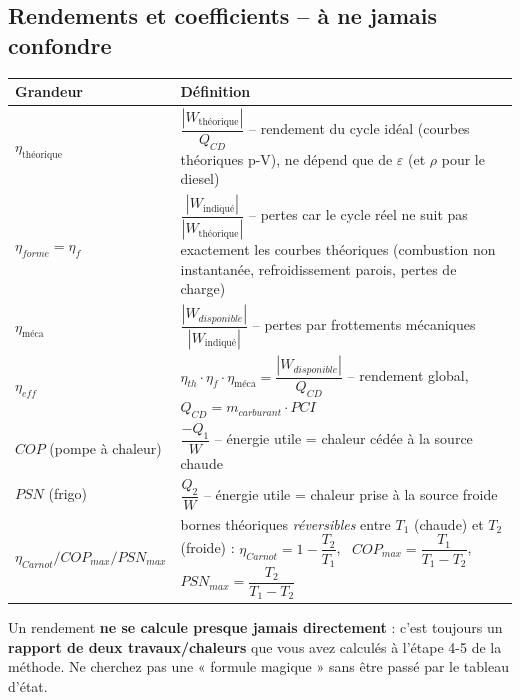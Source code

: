 \subsection{Rendements et coefficients -- à ne jamais confondre}

\begin{center}
\renewcommand{\arraystretch}{1.6}
\begin{tabularx}{\linewidth}{@{}l X@{}}
\toprule
\textbf{Grandeur} & \textbf{Définition} \\
\midrule
$\eta_{\text{théorique}}$ & $\dfrac{|W_{\text{théorique}}|}{Q_{CD}}$ -- rendement du cycle idéal (courbes théoriques
p-V), ne dépend que de $\varepsilon$ (et $\rho$ pour le diesel) \\
$\eta_{forme}=\eta_f$ & $\dfrac{|W_{\text{indiqué}}|}{|W_{\text{théorique}}|}$ -- pertes car le cycle réel ne suit pas
exactement les courbes théoriques (combustion non instantanée, refroidissement parois, pertes de charge) \\
$\eta_{\text{méca}}$ & $\dfrac{|W_{disponible}|}{|W_{\text{indiqué}}|}$ -- pertes par frottements mécaniques \\
$\eta_{eff}$ & $\eta_{th}\cdot\eta_f\cdot\eta_{\text{méca}}=\dfrac{|W_{disponible}|}{Q_{CD}}$ -- rendement global,
$Q_{CD}=m_{carburant}\cdot PCI$ \\
$COP$ (pompe à chaleur) & $\dfrac{-Q_1}{W}$ -- énergie utile = chaleur cédée à la source chaude \\
$PSN$ (frigo) & $\dfrac{Q_2}{W}$ -- énergie utile = chaleur prise à la source froide \\
$\eta_{Carnot}/COP_{max}/PSN_{max}$ & bornes théoriques \emph{réversibles} entre $T_1$ (chaude) et $T_2$
(froide) : $\eta_{Carnot}=1-\dfrac{T_2}{T_1}$, \ $COP_{max}=\dfrac{T_1}{T_1-T_2}$, \
$PSN_{max}=\dfrac{T_2}{T_1-T_2}$ \\
\bottomrule
\end{tabularx}
\end{center}

\begin{piege}
Un rendement \textbf{ne se calcule presque jamais directement} : c'est toujours un \textbf{rapport de deux
travaux/chaleurs} que vous avez calculés à l'étape 4-5 de la méthode. Ne cherchez pas une « formule magique »
sans être passé par le tableau d'état.
\end{piege}


